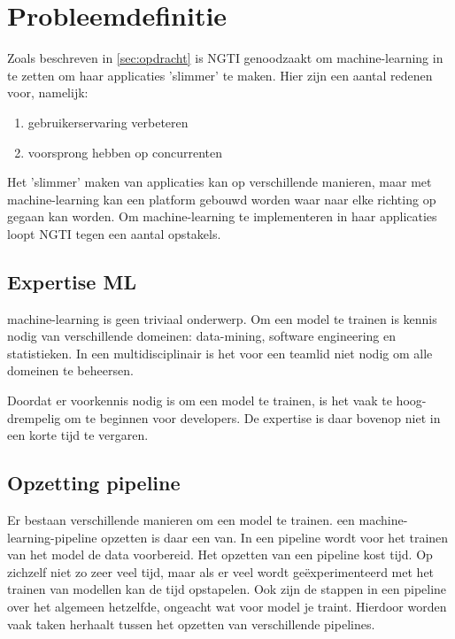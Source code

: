 
\section{Probleemdefinitie}\label{sec:probleemdefinitie}
Zoals beschreven in \autoref{sec:opdracht} is NGTI genoodzaakt om \gls{machine-learning} in te zetten om haar applicaties 'slimmer' te maken. Hier zijn een aantal redenen voor, namelijk:
\begin{enumerate}
  \item gebruikerservaring verbeteren
  \item voorsprong hebben op concurrenten
\end{enumerate}

Het 'slimmer' maken van applicaties kan op verschillende manieren, maar met \gls{machine-learning} kan een platform gebouwd worden waar naar elke richting op gegaan kan worden. Om \gls{machine-learning} te implementeren in haar applicaties loopt NGTI tegen een aantal opstakels.

\subsection{Expertise ML}\label{sec:expertise-vereist}
\Gls{machine-learning} is geen triviaal onderwerp. Om een model te trainen is kennis nodig van verschillende domeinen: \gls{data-mining}, software engineering en statistieken. In een multidisciplinair is het voor een teamlid niet nodig om alle domeinen te beheersen.

Doordat er voorkennis nodig is om een model te trainen, is het vaak te hoog-drempelig om te beginnen voor developers. De expertise is daar bovenop niet in een korte tijd te vergaren.

\subsection{Opzetting pipeline}\label{sec:opzetten-pipeline}
Er bestaan verschillende manieren om een model te trainen. een \gls{machine-learning-pipeline} opzetten is daar een van. In een pipeline wordt voor het trainen van het model de data voorbereid. Het opzetten van een pipeline kost tijd. Op zichzelf niet zo zeer veel tijd, maar als er veel wordt geëxperimenteerd met het trainen van modellen kan de tijd opstapelen. Ook zijn de stappen in een pipeline over het algemeen hetzelfde, ongeacht wat voor model je traint. Hierdoor worden vaak taken herhaalt tussen het opzetten van verschillende pipelines.

